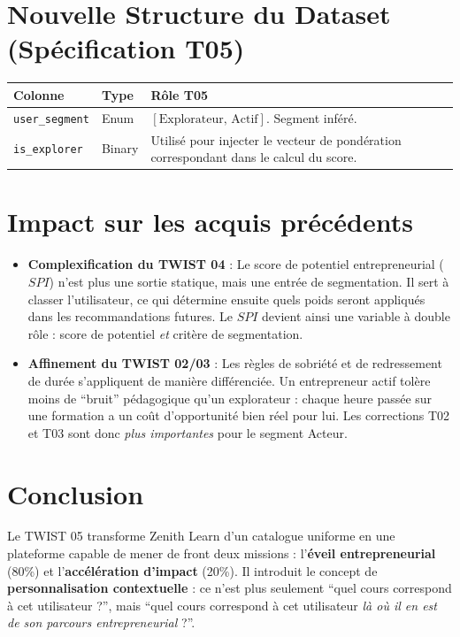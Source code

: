\documentclass[11pt,a4paper]{article}
\begin{document}
\section{Nouvelle Structure du Dataset (Spécification T05)}
\begin{table}[h!]
\centering
\begin{tabular}{|l|l|p{7cm}|}
\hline
\rowcolor{BrandDark} \color{white} Colonne & \rowcolor{BrandDark} \color{white} Type & \rowcolor{BrandDark} \color{white} Rôle T05 \\ \hline
\rowcolor{BrandPrimary!20} \texttt{user\_segment} & Enum & $[\text{Explorateur, Actif}]$. Segment inféré. \\ \hline
\texttt{is\_explorer} & Binary & Utilisé pour injecter le vecteur de pondération correspondant dans le calcul du score. \\ \hline
\end{tabular}
\end{table}

\section{Impact sur les acquis précédents}
\begin{itemize}
    \item \textbf{Complexification du TWIST 04} : Le score de potentiel entrepreneurial ($SPI$) n'est plus une sortie statique, mais une entrée de segmentation. Il sert à classer l'utilisateur, ce qui détermine ensuite quels poids seront appliqués dans les recommandations futures. Le $SPI$ devient ainsi une variable à double rôle : score de potentiel \textit{et} critère de segmentation.
    \item \textbf{Affinement du TWIST 02/03} : Les règles de sobriété et de redressement de durée s'appliquent de manière différenciée. Un entrepreneur actif tolère moins de ``bruit'' pédagogique qu'un explorateur : chaque heure passée sur une formation a un coût d'opportunité bien réel pour lui. Les corrections T02 et T03 sont donc \textit{plus importantes} pour le segment Acteur.
\end{itemize}

\section{Conclusion}
Le TWIST 05 transforme Zenith Learn d'un catalogue uniforme en une plateforme capable de mener de front deux missions : l'\textbf{éveil entrepreneurial} (80\%) et l'\textbf{accélération d'impact} (20\%). Il introduit le concept de \textbf{personnalisation contextuelle} : ce n'est plus seulement ``quel cours correspond à cet utilisateur ?'', mais ``quel cours correspond à cet utilisateur \textit{là où il en est de son parcours entrepreneurial} ?''.
\end{document}
